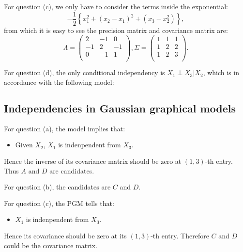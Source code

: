 \documentclass[UTF8]{ctexart}
\begin{document}
For question (c), we only have to consider the terms inside the exponential:
$$-\frac{1}{2}\left\{ x_{1}^{2} + (x_{2}-x_{1})^{2} + (x_{3}-x_{2}^{2}) \right\},$$
from which it is easy to see the precision matrix and covariance matrix are:
$$\Lambda=\begin{pmatrix}2 & -1 & 0 \\ -1 & 2 & -1 \\ 0 & -1 & 1\\ \end{pmatrix},\Sigma = \begin{pmatrix}1 & 1 & 1 \\ 1 & 2 & 2\\ 1 & 2 & 3\\ \end{pmatrix}.$$

For question (d), the only conditional independency is $X_{1}\perp X_{3} | X_{2}$, which is in accordance with the following model:
\begin{figure}[h]
\small
\centering
{}
\end{figure}

\subsection{Independencies in Gaussian graphical models}
For question (a), the model implies that:
\begin{itemize}
\item Given $X_{2}$, $X_{1}$ is indenpendent from $X_{3}$.
\end{itemize}
Hence the inverse of its covariance matrix should be zero at $(1,3)$-th entry.
Thus $A$ and $D$ are candidates.

For question (b), the candidates are $C$ and $D$.

For question (c), the PGM tells that:
\begin{itemize}
\item $X_{1}$ is indenpendent from $X_{3}$.
\end{itemize}
Hence its covariance should be zero at its $(1,3)$-th entry. 
Therefore $C$ and $D$ could be the covariance matrix.
\end{document}
